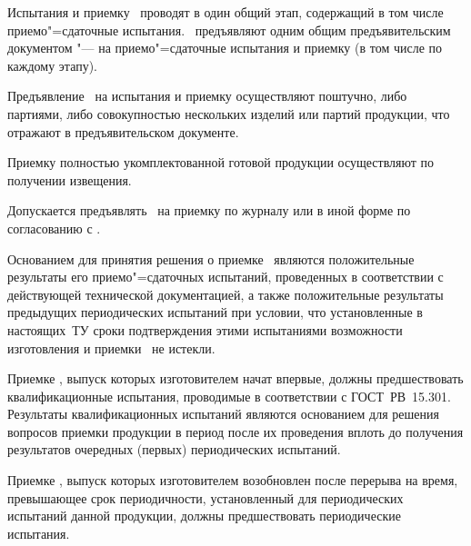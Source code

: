 \point
Испытания и приемку \dut \ проводят в один общий этап, содержащий в том числе приемо"=сдаточные испытания. \dut \ предъявляют одним общим предъявительским документом "--- на приемо"=сдаточные испытания и приемку (в том числе по каждому этапу).

\point
Предъявление \dut \ на испытания и приемку осуществляют поштучно, либо партиями, либо совокупностью нескольких изделий или партий продукции, что отражают в предъявительском документе.

Приемку полностью укомплектованной готовой продукции осуществляют по получении извещения.

Допускается предъявлять \dut \ на приемку по журналу или в иной форме по согласованию с \client.

\point
Основанием для принятия решения о приемке \dut \ являются положительные результаты его приемо"=сдаточных испытаний, проведенных в соответствии с действующей технической документацией, а также положительные результаты предыдущих периодических испытаний при условии, что установленные в настоящих~ТУ сроки подтверждения этими испытаниями возможности изготовления и приемки \dut \ не истекли.

Приемке \dut, выпуск которых изготовителем начат впервые, должны предшествовать квалификационные испытания, проводимые в соответствии с ГОСТ~РВ~15.301. Результаты квалификационных испытаний являются основанием для решения вопросов приемки продукции в период после их проведения вплоть до получения результатов очередных (первых) периодических испытаний.

Приемке \dut, выпуск которых изготовителем возобновлен после перерыва на время, превышающее срок периодичности, установленный для периодических испытаний данной продукции, должны предшествовать периодические испытания.

